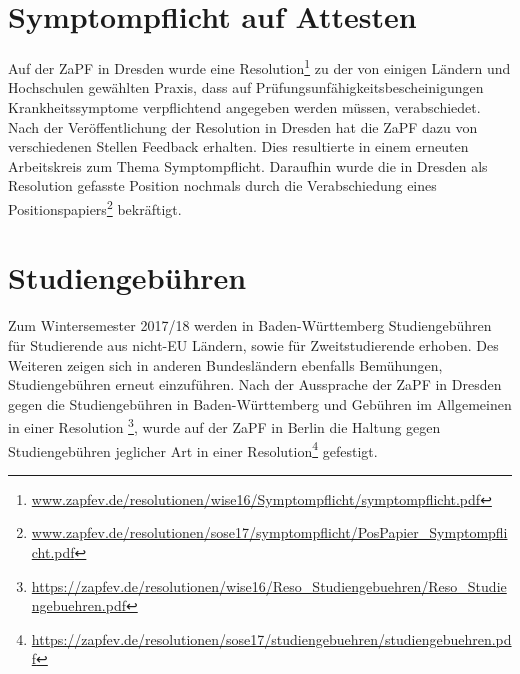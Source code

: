 \documentclass[a4paper]{article}
\begin{document}
\section*{Symptompflicht auf Attesten}
Auf der ZaPF in Dresden wurde eine
Resolution\footnote{\href{https://zapfev.de/resolutionen/wise16/Symptompflicht/symptompflicht.pdf}{\url{www.zapfev.de/resolutionen/wise16/Symptompflicht/symptompflicht.pdf}}}
zu der von einigen Ländern und Hochschulen gewählten Praxis, dass auf
Prüfungsunfähigkeitsbescheinigungen Krankheitssymptome verpflichtend angegeben
werden müssen, verabschiedet.\\ Nach der Veröffentlichung der Resolution in
Dresden hat die ZaPF dazu von verschiedenen Stellen Feedback erhalten. Dies
resultierte in einem erneuten Arbeitskreis zum Thema Symptompflicht. Daraufhin
wurde die in Dresden als Resolution gefasste Position nochmals durch die
Verabschiedung eines
Positionspapiers\footnote{\href{https://zapfev.de/resolutionen/sose17/symptompflicht/PosPapier_Symptompflicht.pdf}{\url{www.zapfev.de/resolutionen/sose17/symptompflicht/PosPapier_Symptompflicht.pdf}}}
bekräftigt.

\section*{Studiengebühren}
Zum Wintersemester 2017/18 werden in Baden-Württemberg Studiengebühren für
Studierende aus nicht-EU Ländern, sowie für Zweitstudierende erhoben. Des
Weiteren zeigen sich in anderen Bundesländern ebenfalls Bemühungen,
Studiengebühren erneut einzuführen.  Nach der Aussprache der ZaPF in Dresden
gegen die Studiengebühren in Baden-Württemberg und Gebühren im Allgemeinen in
einer Resolution
\footnote{\href{https://zapfev.de/resolutionen/wise16/Reso_Studiengebuehren/Reso_Studiengebuehren.pdf}{\url{https://zapfev.de/resolutionen/wise16/Reso_Studiengebuehren/Reso_Studiengebuehren.pdf}}},
wurde auf der ZaPF in Berlin die Haltung gegen Studiengebühren jeglicher Art in
einer
Resolution\footnote{\href{https://zapfev.de/resolutionen/sose17/studiengebuehren/studiengebuehren.pdf}{\url{https://zapfev.de/resolutionen/sose17/studiengebuehren/studiengebuehren.pdf}}}
gefestigt.
\end{document}
